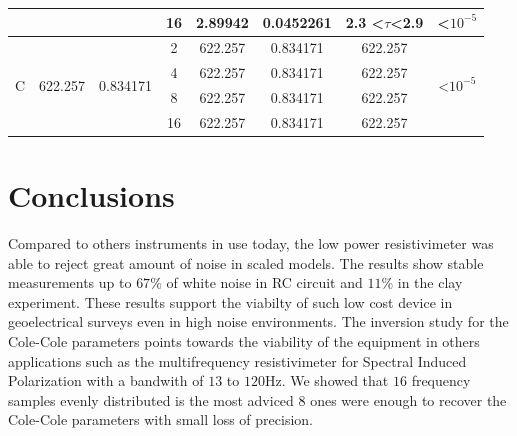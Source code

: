 \documentclass{vie16}
\begin{document}
\begin{table}[H]
\begin{adjustbox}{scale=0.9}
\begin{tabular}{@{}|c|c|c|c|c|c|c|c|@{}}
                   &                          &                            & 16                                 & 2.89942         & 0.0452261         & 2.3 \textless$\tau$\textless 2.9  & \textless $10^{-5}$                  \\ \hline
\multirow{4}{*}{C} & \multirow{4}{*}{622.257} & \multirow{4}{*}{0.834171}  & 2                                  & 622.257         & 0.834171          & 622.257                           & \multirow{4}{*}{\textless $10^{-5}$} \\
                   &                          &                            & 4                                  & 622.257         & 0.834171          & 622.257                           &                                      \\
                   &                          &                            & 8                                  & 622.257         & 0.834171          & 622.257                           &                                      \\
                   &                          &                            & 16                                 & 622.257         & 0.834171          & 622.257                           &                                   \\  \hline
\end{tabular}
\end{adjustbox}
\end{table}


\section{Conclusions}

Compared to others instruments in use today, the low power
resistivimeter was able to reject great amount of noise in scaled
models. The results show stable measurements up to $67\%$ of white
noise in RC circuit and $11 \%$ in the clay experiment. These results 
support the viabilty of such low cost device in geoelectrical
surveys even in high noise environments. The inversion study for the
Cole-Cole parameters points towards the viability of the equipment in
others applications such as the multifrequency resistivimeter for
Spectral Induced Polarization with a bandwith of $13$ to $120$Hz. We
showed that $16$ frequency samples evenly distributed is the most adviced
$8$ ones were enough to recover the Cole-Cole parameters with small loss
of precision.
\end{document}
